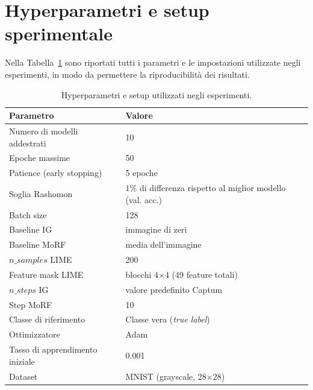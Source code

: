 \documentclass[12pt,a4paper,oneside]{report}
\numberwithin{figure}{chapter}
\numberwithin{table}{chapter}
\begin{document}
\section{Hyperparametri e setup sperimentale}

Nella Tabella~\ref{tab:hyperparams} sono riportati tutti i parametri e le
impostazioni utilizzate negli esperimenti, in modo da permettere la
riproducibilità dei risultati.

\begin{table}[H]
      \centering
      \renewcommand{\arraystretch}{1.2}
      \begin{tabular}{ll}
            \hline
            \textbf{Parametro}              & \textbf{Valore}                                             \\
            \hline
            Numero di modelli addestrati    & 10                                                          \\
            Epoche massime                  & 50                                                          \\
            Patience (early stopping)       & 5 epoche                                                    \\
            Soglia Rashomon                 & $1\%$ di differenza rispetto al miglior modello (val. acc.) \\
            Batch size                      & 128                                                         \\
            Baseline IG                     & immagine di zeri                                            \\
            Baseline MoRF                   & media dell’immagine                                         \\
            $n\_samples$ LIME               & 200                                                         \\
            Feature mask LIME               & blocchi 4×4 (49 feature totali)                             \\
            $n\_steps$ IG                   & valore predefinito Captum                                   \\
            Step MoRF                       & 10                                                          \\
            Classe di riferimento           & Classe vera (\textit{true label})                           \\
            Ottimizzatore                   & Adam                                                        \\
            Tasso di apprendimento iniziale & 0.001                                                       \\
            Dataset                         & MNIST (grayscale, 28×28)                                    \\
            \hline
      \end{tabular}
      \caption{Hyperparametri e setup utilizzati negli esperimenti.}
      \label{tab:hyperparams}
\end{table}
\end{document}
